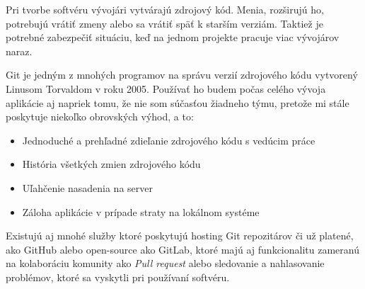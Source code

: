 Pri tvorbe softvéru vývojári vytvárajú zdrojový kód. Menia, rozširujú ho, potrebujú vrátiť zmeny alebo sa vrátiť späť k starším verziám. Taktiež je potrebné zabezpečiť situáciu, keď na jednom projekte pracuje viac vývojárov naraz. \citep{otte2009version} 

Git je jedným z mnohých programov na správu verzií zdrojového kódu vytvorený Linusom Torvaldom v roku 2005. Používať ho budem počas celého vývoja aplikácie aj napriek tomu, že nie som súčasťou žiadneho týmu, pretože mi stále poskytuje niekoľko obrovských výhod, a to: 

\begin{itemize}
    \item Jednoduché a prehľadné zdieľanie zdrojového kódu s vedúcim práce
    \item História všetkých zmien zdrojového kódu
    \item Uľahčenie nasadenia na server
    \item Záloha aplikácie v prípade straty na lokálnom systéme
\end{itemize}

Existujú aj mnohé služby ktoré poskytujú hosting Git repozitárov či už platené, ako GitHub alebo open-source ako GitLab, ktoré majú aj funkcionalitu zameranú na kolaboráciu komunity ako \emph{Pull request} alebo sledovanie a nahlasovanie problémov, ktoré sa vyskytli pri používaní softvéru.